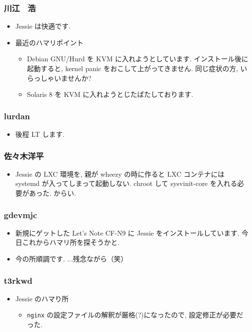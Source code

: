 \documentclass[cjk,dvipdfmx,10pt,compress,%
hyperref={bookmarks=true,bookmarksnumbered=true,bookmarksopen=false,%
  colorlinks=false,%
  pdftitle={第 99 回 関西 Debian 勉強会},%
  pdfauthor={倉敷・のがた・佐々木・かわだ},%
  pdfsubject={資料},%
}]{beamer}
\begin{document}


\begin{frame}
\frametitle{川江　浩}
\begin{itemize}
\item %
  Jessie は快適です.
\item %
  最近のハマリポイント
  \begin{itemize}
  \item %
    Debian GNU/Hurd を KVM に入れようとしています. インストール後に起動すると, kernel panic をおこして上がってきません. 同じ症状の方, いらっしゃいませんか?
  \item %
    Solaris 8 を KVM に入れようとじたばたしております.
  \end{itemize}
\end{itemize}
\end{frame}
\begin{frame}
\frametitle{lurdan}
\begin{itemize}
\item 後程 LT します.
\end{itemize}
\end{frame}
\begin{frame}
\frametitle{佐々木洋平}
\begin{itemize}
\item %
  Jessie の LXC 環境を, 親が wheezy の時に作ると LXC コンテナには systemd が入ってしまって起動しない. chroot して sysvinit-core を入れる必要があった. からい.
\end{itemize}
\end{frame}
\begin{frame}
\frametitle{gdevmjc}
\begin{itemize}
\item 新規にゲットした Let's Note CF-N9 に Jessie をインストールしています. 今日これからハマリ所を探そうかと.
\item 今の所順調です. ...残念ながら（笑）
\end{itemize}
\end{frame}
\begin{frame}
\frametitle{t3rkwd}
\begin{itemize}
\item %
  Jessie のハマり所
  \begin{itemize}
  \item %
    \texttt{nginx} の設定ファイルの解釈が厳格(?)になったので, 設定修正が必要だった.
  \end{itemize}
\end{itemize}
\end{frame}
\end{document}

